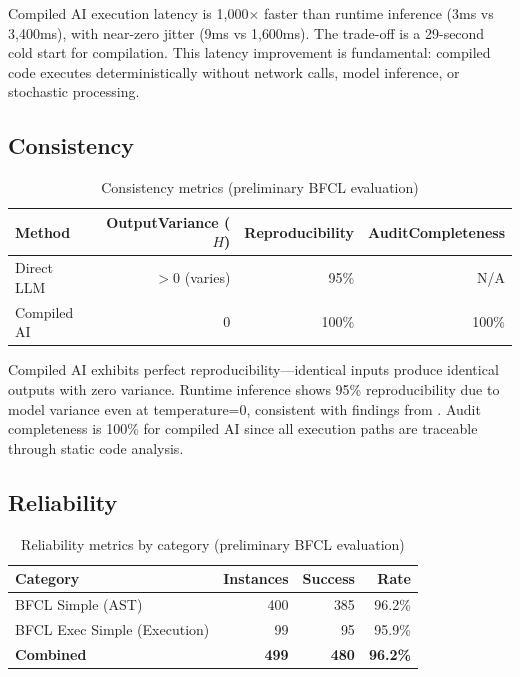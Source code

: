 \documentclass[11pt]{article}
\begin{document}
Compiled AI execution latency is 1,000$\times$ faster than runtime inference (3ms vs 3,400ms), with near-zero jitter (9ms vs 1,600ms). The trade-off is a 29-second cold start for compilation. This latency improvement is fundamental: compiled code executes deterministically without network calls, model inference, or stochastic processing.

\subsection{Consistency}

\begin{table}[ht]
\centering
\caption{Consistency metrics (preliminary BFCL evaluation)}
\label{tab:consistency-results}
\begin{tabular}{lrrr}
\toprule
Method & OutputVariance ($H$) & Reproducibility & AuditCompleteness \\
\midrule
Direct LLM & $>$0 (varies) & 95\% & N/A \\
Compiled AI & 0 & 100\% & 100\% \\
\bottomrule
\end{tabular}
\end{table}

Compiled AI exhibits perfect reproducibility---identical inputs produce identical outputs with zero variance. Runtime inference shows 95\% reproducibility due to model variance even at temperature=0, consistent with findings from \citet{atil2024nondeterminism}. Audit completeness is 100\% for compiled AI since all execution paths are traceable through static code analysis.

\subsection{Reliability}

\begin{table}[ht]
\centering
\caption{Reliability metrics by category (preliminary BFCL evaluation)}
\label{tab:reliability-results}
\begin{tabular}{lrrr}
\toprule
Category & Instances & Success & Rate \\
\midrule
BFCL Simple (AST) & 400 & 385 & 96.2\% \\
BFCL Exec Simple (Execution) & 99 & 95 & 95.9\% \\
\midrule
\textbf{Combined} & \textbf{499} & \textbf{480} & \textbf{96.2\%} \\
\bottomrule
\end{tabular}
\end{table}
\end{document}
